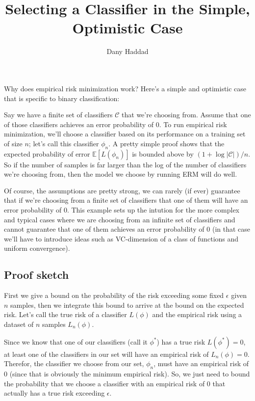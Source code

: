 \documentclass[12pt]{article}
\title{Selecting a Classifier in the Simple, Optimistic Case}
\author{Dany Haddad}
\begin{document}
\maketitle

Why does empirical risk minimization work? Here's a simple and optimistic case that is specific to binary classification:

Say we have a finite set of classifiers $\mathcal{C}$ that we're choosing from. Assume that one of those classifiers achieves an error probability of $0$. To run empirical risk minimization, we'll choose a classifier based on its performance on a training set of size $n$; let's call this classifier $\phi_n$. A pretty simple proof shows that the expected probability of error $\mathbb{E}[L(\phi_n)]$ is bounded above by $(1 + \log | \mathcal{C} |)/n$. So if the number of samples is far larger than the log of the number of classifiers we're choosing from, then the model we choose by running ERM will do well.

Of course, the assumptions are pretty strong, we can rarely (if ever) guarantee that if we're choosing from a finite set of classifiers that one of them will have an error probability of $0$. This example sets up the intution for the more complex and typical cases where we are choosing from an infinite set of classifiers and cannot guarantee that one of them achieves an error probability of $0$ (in that case we'll have to introduce ideas such as VC-dimension of a class of functions and uniform convergence).

\subsection*{Proof sketch}

First we give a bound on the probability of the risk exceeding some fixed $\epsilon$ given $n$ samples, then we integrate this bound to arrive at the bound on the expected risk. Let's call the true risk of a classifier $L(\phi)$ and the empirical risk using a dataset of $n$ samples $L_n(\phi)$.

Since we know that one of our classifiers (call it $\phi^*$) has a
true risk $L(\phi^*) = 0$, at least one of the classifiers in our set
will have an empirical risk of $L_n(\phi) = 0$. Therefor, the
classifier we choose from our set, $\phi_n$, must have an empirical
risk of $0$ (since that is obviously the minimum empirical risk). So,
we just need to bound the probability that we choose a classifier with
an empirical risk of $0$ that actually has a true risk exceeding
$\epsilon$.
\end{document}
